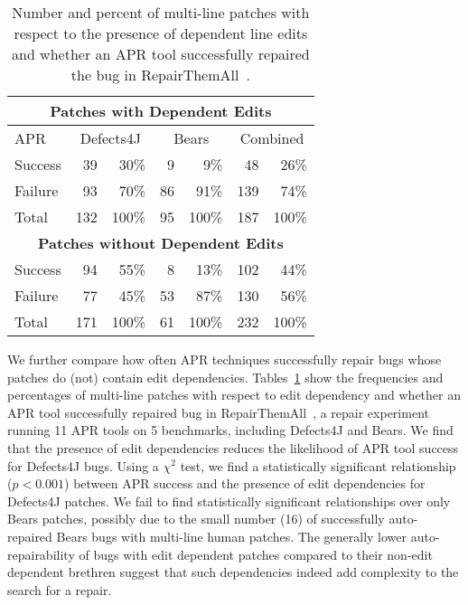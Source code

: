 \documentclass[sigconf, timestamp-false, anonymous=true]{acmart}
\begin{document}
\begin{table}
{\begin{center}
	\begin{tabular}{l | rr | rr | rr}
		\toprule
		\multicolumn{7}{c}{\textbf{Patches with Dependent Edits}} \\
		\midrule
		APR & \multicolumn{2}{c}{Defects4J} & \multicolumn{2}{c}{Bears} & \multicolumn{2}{c}{Combined} \\
		\midrule
		Success & 39 & 30\% & 9 & 9\% & 48 & 26\% \\
		Failure & 93 & 70\% & 86 & 91\% & 139 & 74\% \\
		\midrule
		Total & 132 & 100\% & 95 & 100\% & 187 & 100\% \\
		\midrule
		\multicolumn{7}{c}{\textbf{Patches without Dependent Edits}} \\
		\midrule
		Success & 94 & 55\% & 8 & 13\% & 102 & 44\% \\
		Failure & 77 & 45\% & 53 & 87\% & 130 & 56\% \\
		\midrule
		Total & 171 & 100\% & 61 & 100\% & 232 & 100\% \\
		\bottomrule
	\end{tabular}
 \end{center}
}
	\caption{Number and percent of multi-line patches with respect to the presence of 
	dependent line edits and whether an APR tool successfully 
	repaired the bug in RepairThemAll~\cite{durieux-repair-them-all}.}
	\label{tab:dependency-repair-contingency-table}
\end{table}

We further compare how often APR techniques 
successfully repair bugs whose patches do (not) contain edit dependencies.
Tables~\ref{tab:dependency-repair-contingency-table}
show the frequencies and percentages of multi-line patches with respect to edit dependency 
and whether an APR tool successfully repaired bug in 
RepairThemAll~\cite{durieux-repair-them-all}, a repair experiment running 
11 APR tools on 5 benchmarks, including Defects4J and Bears.
We find that the presence of edit dependencies 
reduces the likelihood of APR tool success for Defects4J bugs.
Using a $\chi^2$ test, we find a statistically significant relationship ($p < 0.001$)
between APR success and the presence of edit dependencies for Defects4J patches. 
We fail to find statistically 
significant relationships over only Bears patches, possibly due to the small number (16) of 
successfully auto-repaired Bears bugs with multi-line human patches.
The generally lower auto-repairability of bugs with edit dependent patches compared 
to their non-edit dependent brethren suggest that such dependencies indeed 
add complexity to the search for a repair.
\end{document}
